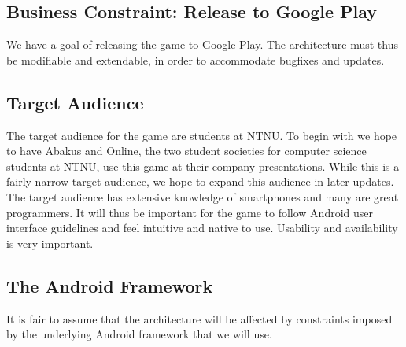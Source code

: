 \subsection{Business Constraint: Release to Google Play}
We have a goal of releasing the game to Google Play. The architecture must thus
be modifiable and extendable, in order to accommodate bugfixes and updates.

\subsection{Target Audience}
The target audience for the game are students at NTNU\@. To begin with we hope
to have Abakus and Online, the two student societies for computer science
students at NTNU, use this game at their company presentations. While this is a
fairly narrow target audience, we hope to expand this audience in later updates.
The target audience has extensive knowledge of smartphones and many are great
programmers. It will thus be important for the game to follow Android user
interface guidelines and feel intuitive and native to use. Usability and
availability is very important.

\subsection{The Android Framework}
It is fair to assume that the architecture will be affected by constraints
imposed by the underlying Android framework that we will use.
